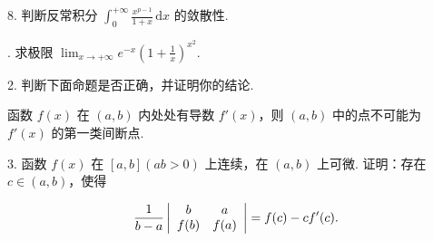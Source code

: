 \documentclass{examcollection}
\renewcommand{\displayformula}[1]{\[#1\]}
\begin{document}
{\begin{minipage}{\textwidth}
8. 判断反常积分 $\int_0^{+\infty} \frac{x^{p-1}}{1 + x} \, \mathrm{d}x$ 的敛散性.\par
{}. 求极限 $\lim_{x\to +\infty}e^{-x}\left(1 + \frac{1}{x}\right)^{x^2}$.\par
2. 判断下面命题是否正确，并证明你的结论.\par
函数 $f(x)$ 在 $(a,b)$ 内处处有导数 $f'(x)$，则 $(a,b)$ 中的点不可能为 $f'(x)$ 的第一类间断点.\par
3. 函数 $f(x)$ 在 $[a, b] (ab > 0)$ 上连续，在 $(a, b)$ 上可微. 证明：存在 $c \in (a, b)$，使得\par
\displayformula{\frac {1}{b - a} \left| \begin{array}{c c} b & a \\ f (b) & f (a) \end{array} \right| = f (c) - c f ^ {\prime} (c).}\par
\end{minipage}}
\ifdim\dimexpr\ht\proofbox+\dp\proofbox\relax>\textheight
\noindent\resizebox{!}{\textheight}{\usebox{\proofbox}}\else\noindent\usebox{\proofbox}\fi\clearpage
\end{document}
